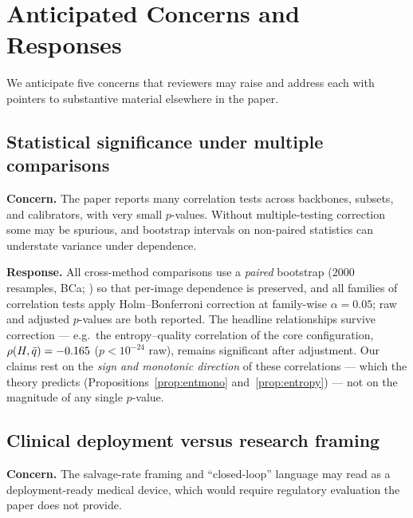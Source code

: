 
\section{Anticipated Concerns and Responses}\label{app:a21}

We anticipate five concerns that reviewers may raise and address each with pointers to substantive
material elsewhere in the paper.

\subsection{Statistical significance under multiple comparisons}\label{app:a21-stats}
\textbf{Concern.} The paper reports many correlation tests across backbones, \itb subsets, and
calibrators, with very small $p$-values. Without multiple-testing correction some may be spurious,
and bootstrap intervals on non-paired statistics can understate variance under dependence.

\textbf{Response.} All cross-method comparisons use a \emph{paired} bootstrap ($2000$ resamples, BCa;
\citealp{diciccio1996bootstrap}) so that per-image dependence is preserved, and all families of
correlation tests apply Holm--Bonferroni correction \citep{holm1979simple} at family-wise
$\alpha=0.05$; raw and adjusted $p$-values are both
reported. The headline relationships survive correction --- e.g.\ the entropy--quality correlation of
the core configuration, $\rho(H,\bar{q})=-0.165$ ($p<10^{-24}$ raw), remains significant after
adjustment. Our claims rest on the \emph{sign and monotonic direction} of these correlations ---
which the theory predicts (Propositions~\ref{prop:entmono} and~\ref{prop:entropy}) --- not on the
magnitude of any single $p$-value.

\subsection{Clinical deployment versus research framing}\label{app:a21-clinical}
\textbf{Concern.} The salvage-rate framing and ``closed-loop'' language may read as a
deployment-ready medical device, which would require regulatory evaluation the paper does not provide.

